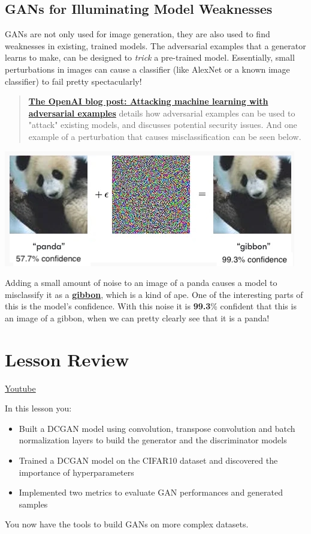 \subsection{GANs for Illuminating Model Weaknesses}
GANs are not only used for image generation, they are also used to find weaknesses in existing, trained models. The adversarial examples that a generator learns to make, can be designed to \textit{trick} a pre-trained model. Essentially, small perturbations in images can cause a classifier (like AlexNet or a known image classifier) to fail pretty spectacularly!

\begin{quote}
\href{https://openai.com/index/attacking-machine-learning-with-adversarial-examples}{\textbf{The OpenAI blog post: Attacking machine learning with adversarial examples}} details how adversarial examples can be used to "attack" existing models, and discusses potential security issues. And one example of a perturbation that causes misclassification can be seen below.

\end{quote}

\includegraphics[width=0.75\linewidth]{img//genAdvNet//deepGAN/openai-attacking-machine-learning-with-adversarial-examples.jpeg}

Adding a small amount of noise to an image of a panda causes a model to misclassify it as a \href{https://en.wikipedia.org/wiki/Gibbon}{\textbf{gibbon}}, which is a kind of ape. One of the interesting parts of this is the model's confidence. With this noise it is \textbf{99.3}\% confident that this is an image of a gibbon, when we can pretty clearly see that it is a panda!

\section{Lesson Review}
\href{https://www.youtube.com/watch?v=84LLLNYDrRM}{Youtube} \newline

In this lesson you:

\begin{itemize}
    \item Built a DCGAN model using convolution, transpose convolution and batch normalization layers to build the generator and the discriminator models
    \item Trained a DCGAN model on the CIFAR10 dataset and discovered the importance of hyperparameters
    \item Implemented two metrics to evaluate GAN performances and generated samples
\end{itemize}
You now have the tools to build GANs on more complex datasets.
